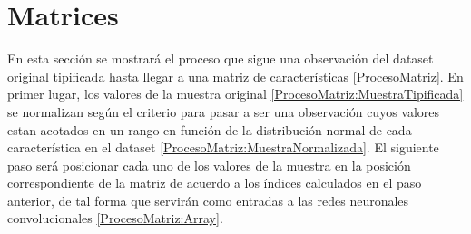 \section{Matrices}

  En esta sección se mostrará el proceso que sigue una observación del dataset original tipificada hasta llegar a una matriz de características \eqref{ProcesoMatriz}. En primer lugar, los valores de la muestra original \eqref{ProcesoMatriz:MuestraTipificada} se normalizan según el criterio  para pasar a ser una observación cuyos valores estan acotados en un rango en función de la distribución normal de cada característica en el dataset \eqref{ProcesoMatriz:MuestraNormalizada}. El siguiente paso será posicionar cada uno de los valores de la muestra en la posición correspondiente de la matriz de acuerdo a los índices calculados en el paso anterior, de tal forma que servirán como entradas a las redes neuronales convolucionales \eqref{ProcesoMatriz:Array}.

